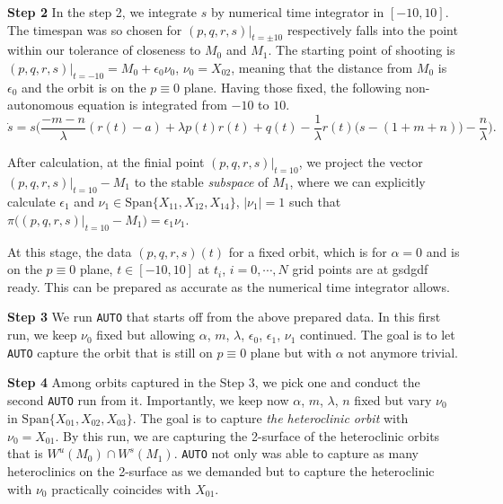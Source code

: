 \documentclass[a4paper,11pt]{article}
\theoremstyle{remark}
\begin{document}
{\bf \noindent Step 2}
In the step 2, we integrate $s$ by numerical time integrator in $[-10,10]$. The timespan was so chosen for $(p,q,r,s)|_{t=\pm10}$ respectively falls into the point within our tolerance of closeness to $M_0$ and $M_1$. The starting point of shooting is $(p,q,r,s)|_{t=-10} = M_0 + \epsilon_0 \nu_0$, $\nu_0 = X_{02}$, meaning that the distance from $M_0$ is $\epsilon_0$ and the orbit is on the $p\equiv0$ plane. Having those fixed, the following non-autonomous equation is integrated from $-10$ to $10$.
$$\dot{s} =s\Big(\frac{-m-n}{\lambda}(r(t)-a) + \lambda p(t)r(t) + q(t) - \frac{1}{\lambda}r(t)\big(s- (1+m+n)\big) - \frac{n}{\lambda}\Big).$$

After calculation, at the finial point $(p,q,r,s)|_{t=10}$, we project the vector $(p,q,r,s)|_{t=10}- M_1$ to the stable {\it subspace} of $M_1$, where we can explicitly calculate $\epsilon_1$ and $\nu_1 \in \underset{}{ \textrm{Span}}\{X_{11},X_{12},X_{14}\}$, $|\nu_1|=1$ such that
$\pi\big((p,q,r,s)|_{t=10}- M_1\big) =\epsilon_1 \nu_1$.

At this stage, the data $(p,q,r,s)(t)$ for a fixed orbit, which is for $\alpha=0$ and is on the $p\equiv0$ plane,  $t\in[-10,10]$ at $t_i$, $i=0,\cdots,N$ grid points are at gsdgdf ready. This can be prepared as accurate as the numerical time integrator allows. 

{\bf \noindent Step 3}
We run \texttt{AUTO} that starts off from the above prepared data. In this first run, we keep $\nu_0$ fixed but allowing $\alpha$, $m$, $\lambda$, $\epsilon_0$, $\epsilon_1$, $\nu_1$ continued.  The goal is to let \texttt{AUTO} capture the orbit that is still on $p\equiv0$ plane but with $\alpha$ not anymore trivial.

{\bf \noindent Step 4}
Among orbits captured in the Step 3, we pick one and conduct the second \texttt{AUTO} run from it. Importantly, we keep now $\alpha$, $m$, $\lambda$, $n$ fixed but vary $\nu_0$ in $\underset{}{ \textrm{Span}}\{X_{01},X_{02},X_{03}\}$. The goal is to capture {\it the heteroclinic orbit} with $\nu_0=X_{01}$. By this run, we are capturing the 2-surface of the heteroclinic orbits that is $W^u(M_0)\cap W^s(M_1)$. \texttt{AUTO} not only was able to capture as many heteroclinics on the 2-surface as we demanded but to capture the heteroclinic with $\nu_0$ practically coincides with $X_{01}$.

\pagebreak
\appendix
\renewcommand\thetheorem{\Alph{theorem}}
\setcounter{theorem}{\thetmp}
\end{document}
